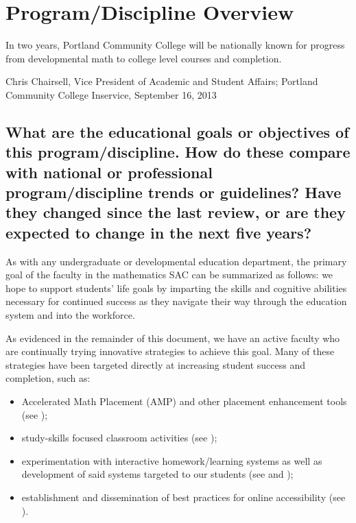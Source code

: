 \chapter{Program/Discipline Overview}

\epigraph{In two years, Portland Community College will be nationally known for
progress from developmental math to college level courses and completion.}
{Chris Chairsell, Vice President of Academic and Student Affairs; Portland
Community College Inservice, September 16, 2013}

\section[Educational objectives]{What are the educational goals or objectives of this
 program/discipline.   How do these compare with national or professional
 program/discipline trends or guidelines?   Have they changed since the last
review, or are they expected to change in the next five years? }

As with any undergraduate or developmental education department, the primary
goal of the faculty in the mathematics SAC can be summarized as follows: we hope
to support students' life goals by imparting the skills and cognitive
abilities necessary for continued success as they navigate their way through the
education system and into the workforce.

As evidenced in the remainder of this document, we have an active faculty who
are continually trying innovative strategies to achieve this goal.  Many of
these strategies have been targeted directly at increasing student success and
completion, such as:
\begin{itemize}
	\item Accelerated Math Placement (AMP) and other placement enhancement tools
	(see );
	\item study-skills focused classroom activities (see );
	\item experimentation with interactive homework/learning systems as well as
	development of said systems targeted to our students (see
	 and );
	\item establishment and dissemination of best practices for
	online accessibility (see ).
\end{itemize}

